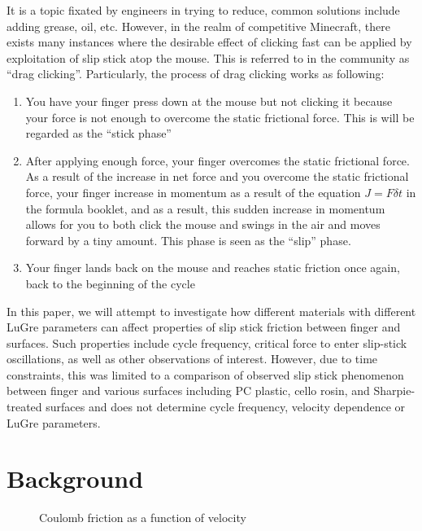 \documentclass[12pt]{article}
\begin{document}
    It is a topic fixated by engineers in trying to reduce, common solutions include adding grease, oil, etc. However, in the realm of competitive Minecraft, there exists many instances where the desirable effect of clicking fast can be applied by exploitation of slip stick atop the mouse. This is referred to in the community as “drag clicking”.
    Particularly, the process of drag clicking works as following:
\begin{enumerate}
    \item You have your finger press down at the mouse but not clicking it because your force is not enough to overcome the static frictional force. This is will be regarded as the ``stick phase''
    \item After applying enough force, your finger overcomes the static frictional force. As a result of the increase in net force and you overcome the static frictional force, your finger increase in momentum as a result of the equation $J=F\delta t$ in the formula booklet, and as a result, this sudden increase in momentum allows for you to both click the mouse and swings in the air and moves forward by a tiny amount. This phase is seen as the ``slip'' phase.
    \item Your finger lands back on the mouse and reaches static friction once again, back to the beginning of the cycle

\end{enumerate}

    In this paper, we will attempt to investigate how different materials with different LuGre parameters can affect properties of slip stick friction between finger and surfaces. Such properties include cycle frequency, critical force to enter slip-stick oscillations, as well as other observations of interest.
    However, due to time constraints, this was limited to a comparison of observed slip stick phenomenon between finger and various surfaces including PC plastic, cello rosin, and Sharpie-treated surfaces and does not determine cycle frequency, velocity dependence or LuGre parameters.

\section{Background}
\label{sec:background}

\begin{figure}
    \centering
    \caption{Coulomb friction as a function of velocity}
    \label{fig:coulombgraph}
\end{figure}
\end{document}
